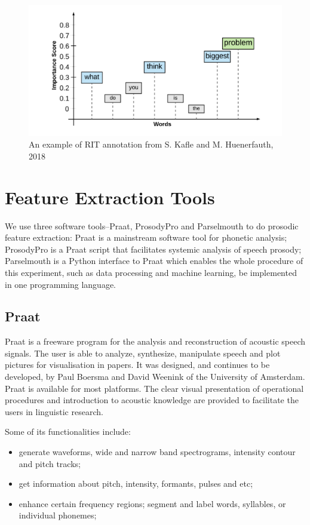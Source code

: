 \begin{figure}[ht]
	\includegraphics[width=15cm]{figures/word.png}
	\caption{An example of RIT annotation from S. Kafle and M. Huenerfauth, 2018}
	\label{fig:word}
\end{figure}

\section{Feature Extraction Tools} 
We use three software tools--Praat, ProsodyPro and Parselmouth to do prosodic feature extraction: Praat is a mainstream software tool for phonetic analysis; ProsodyPro is a Praat script that facilitates systemic analysis of speech prosody; Parselmouth is a Python interface to Praat which enables the whole procedure of this experiment, such as data processing and machine learning, be implemented in one programming language.

\subsection{ Praat}
Praat \citep{PaulBoersma&DavidWeenink2018} is a freeware program for the analysis and reconstruction of acoustic speech signals. The user is able to analyze, synthesize, manipulate speech and plot pictures for visualisation in papers. It was designed, and continues to be developed, by Paul Boersma and David Weenink of the University of Amsterdam. Praat is available for most platforms. The clear visual presentation of operational procedures and introduction to acoustic knowledge are provided to facilitate the users in linguistic research.

Some of its functionalities include:
\begin{itemize}
	\item generate waveforms, wide and narrow band spectrograms, intensity contour and pitch tracks;
	\item get information about pitch, intensity, formants, pulses and etc;
	\item enhance certain frequency regions; segment and label words, syllables, or individual phonemes;
\end{itemize}

